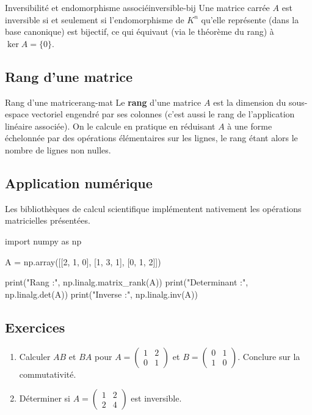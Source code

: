 \documentclass[theme=pringlea]{myrtille}
\begin{document}
\begin{myrthm}{Inversibilité et endomorphisme associé}{inversible-bij}
Une matrice carrée $A$ est inversible si et seulement si l'endomorphisme de $K^n$ qu'elle représente (dans la base canonique) est bijectif, ce qui équivaut (via le théorème du rang) à $\ker A = \{0\}$.
\end{myrthm}

\subsection{Rang d'une matrice}
\begin{myrdef}{Rang d'une matrice}{rang-mat}
Le \textbf{rang} d'une matrice $A$ est la dimension du sous-espace vectoriel engendré par ses colonnes (c'est aussi le rang de l'application linéaire associée). On le calcule en pratique en réduisant $A$ à une forme échelonnée par des opérations élémentaires sur les lignes, le rang étant alors le nombre de lignes non nulles.
\end{myrdef}

\subsection{Application numérique}
Les bibliothèques de calcul scientifique implémentent nativement les opérations matricielles présentées.

\begin{pyblock}
import numpy as np

A = np.array([[2, 1, 0],
              [1, 3, 1],
              [0, 1, 2]])

print("Rang :", np.linalg.matrix_rank(A))
print("Determinant :", np.linalg.det(A))
print("Inverse :\n", np.linalg.inv(A))
\end{pyblock}

\subsection{Exercices}
\begin{enumerate}
    \item Calculer $AB$ et $BA$ pour $A = \begin{pmatrix} 1 & 2 \\ 0 & 1 \end{pmatrix}$ et $B = \begin{pmatrix} 0 & 1 \\ 1 & 0 \end{pmatrix}$. Conclure sur la commutativité.
    \item Déterminer si $A = \begin{pmatrix} 1 & 2 \\ 2 & 4 \end{pmatrix}$ est inversible.
\end{enumerate}
\end{document}
